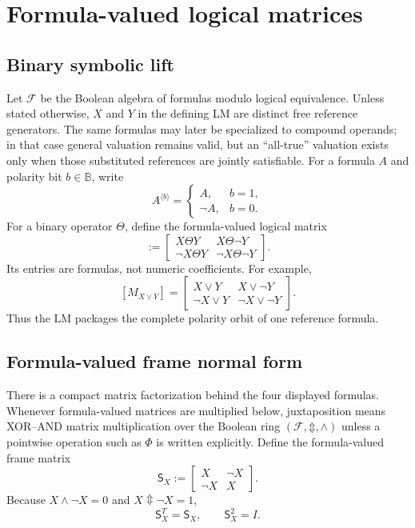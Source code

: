 \documentclass[11pt]{article}
\theoremstyle{definition}
\theoremstyle{remark}
\newcommand{\B}{\mathbb B}
\newcommand{\cF}{\mathcal F}
\newcommand{\xor}{\mathbin{\Updownarrow}}
\begin{document}
\section{Formula-valued logical matrices}
\label{sec:lm}

\subsection{Binary symbolic lift}

Let $\cF$ be the Boolean algebra of formulas modulo logical equivalence.  Unless stated otherwise, $X$ and $Y$ in the defining LM are distinct free reference generators.  The same formulas may later be specialized to compound operands; in that case general valuation remains valid, but an ``all-true'' valuation exists only when those substituted references are jointly satisfiable.  For a formula $A$ and polarity bit $b\in\B$, write
\begin{equation}
 A^{\langle b\rangle}=\begin{cases}A,&b=1,\\\neg A,&b=0.\end{cases}
 \label{eq:polarity}
\end{equation}
For a binary operator $\Theta$, define the formula-valued logical matrix
\begin{equation}
 [M_{X\Theta Y}]:=
 \begin{bmatrix}
 X\Theta Y&X\Theta\neg Y\\
 \neg X\Theta Y&\neg X\Theta\neg Y
 \end{bmatrix}.
 \label{eq:binarylm}
\end{equation}
Its entries are formulas, not numeric coefficients.  For example,
\[
 [M_{X\lor Y}]=
 \begin{bmatrix}
 X\lor Y&X\lor\neg Y\\
 \neg X\lor Y&\neg X\lor\neg Y
 \end{bmatrix}.
\]
Thus the LM packages the complete polarity orbit of one reference formula.

\subsection{Formula-valued frame normal form}

There is a compact matrix factorization behind the four displayed formulas.  Whenever formula-valued matrices are multiplied below, juxtaposition means XOR--AND matrix multiplication over the Boolean ring $(\cF,\xor,\land)$ unless a pointwise operation such as $\widehat\Phi$ is written explicitly.
Define the formula-valued frame matrix
\begin{equation}
 \mathsf S_X:=
 \begin{bmatrix}
 X&\neg X\\
 \neg X&X
 \end{bmatrix}.
 \label{eq:frameSX}
\end{equation}
Because $X\land\neg X=0$ and $X\xor\neg X=1$,
\begin{equation}
 \mathsf S_X^T=\mathsf S_X,
 \qquad
 \mathsf S_X^2=I.
 \label{eq:frameinvolution}
\end{equation}
\end{document}
